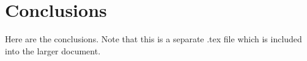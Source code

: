 \section{Conclusions}
Here are the conclusions.  Note that this is a separate .tex file which is included into the larger document.